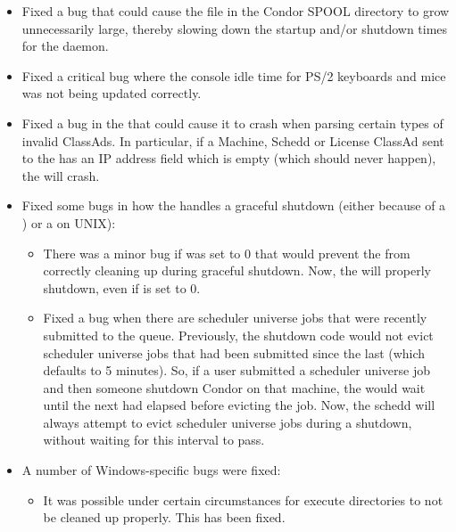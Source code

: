 \begin{itemize}

\item Fixed a bug that could cause the file  in
	the Condor SPOOL directory to grow unnecessarily large, thereby
	slowing down the startup and/or shutdown times for the 
	daemon.

\item Fixed a critical bug where the console idle time for PS/2 keyboards
	and mice was not being updated correctly.

\item Fixed a bug in the  that could cause it to
crash when parsing certain types of invalid ClassAds.  In particular, if
a Machine, Schedd or License ClassAd sent to the  has
an IP address field which is empty (which should never happen), the
 will crash.

\item Fixed some bugs in how the  handles a graceful
  shutdown (either because of a ) or a \verb@SIGTERM@ on
  UNIX): 
\begin{itemize}
  \item There was a minor bug if  was set to
     0 that would prevent the  from correctly cleaning
     up during graceful shutdown.
     Now, the  will properly shutdown, even if
      is set to 0.

  \item Fixed a bug when there are scheduler universe jobs that were
    recently submitted to the queue.
    Previously, the shutdown code would not evict scheduler universe
    jobs that had been submitted since the last
     (which defaults to 5 minutes).
    So, if a user submitted a scheduler universe job and then someone
    shutdown Condor on that machine, the  would wait
    until the next  had elapsed before
    evicting the job.
    Now, the schedd will always attempt to evict scheduler universe
    jobs during a shutdown, without waiting for this interval to pass.
\end{itemize}

\item A number of Windows-specific bugs were fixed:
\begin{itemize}
  \item It was possible under certain circumstances for execute
  directories to not be cleaned up properly. This has been fixed.


\end{itemize}
\end{itemize}
